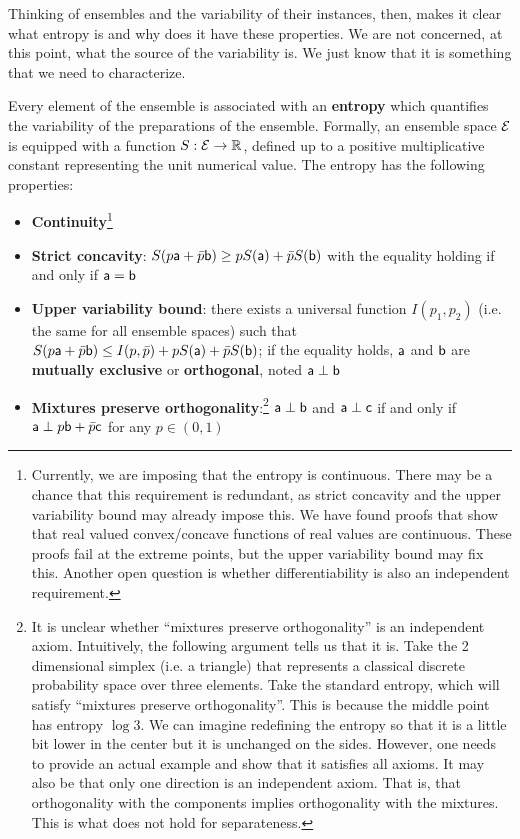 Thinking of ensembles and the variability of their instances, then, makes it clear what entropy is and why does it have these properties. We are not concerned, at this point, what the source of the variability is. We just know that it is something that we need to characterize.

\begin{mathSection}
\begin{axiom}
	Every element of the ensemble is associated with an \textbf{entropy} which quantifies the variability of the preparations of the ensemble. Formally, an ensemble space $\Ens$ is equipped with a function $S : \Ens \to \mathbb{R}$, defined up to a positive multiplicative constant representing the unit numerical value. The entropy has the following properties:
	\begin{itemize}
		\item \textbf{Continuity}\footnote{Currently, we are imposing that the entropy is continuous. There may be a chance that this requirement is redundant, as strict concavity and the upper variability bound may already impose this. We have found proofs that show that real valued convex/concave functions of real values are continuous. These proofs fail at the extreme points, but the upper variability bound may fix this. Another open question is whether differentiability is also an independent requirement.}
		\item \textbf{Strict concavity}: $S(p\ens[a] + \bar{p} \ens[b]) \geq p S(\ens[a]) + \bar{p} S(\ens[b])$ with the equality holding if and only if $\ens[a] = \ens[b]$
		\item \textbf{Upper variability bound}: there exists a universal function $I(p_1, p_2)$ (i.e. the same for all ensemble spaces) such that $S(p\ens[a] + \bar{p} \ens[b]) \leq I(p, \bar{p}) + p S(\ens[a]) + \bar{p} S(\ens[b])$; if the equality holds, $\ens[a]$ and $\ens[b]$ are \textbf{mutually exclusive} or \textbf{orthogonal}, noted $\ens[a] \ortho \ens[b]$
		\item \textbf{Mixtures preserve orthogonality}:\footnote{It is unclear whether ``mixtures preserve orthogonality'' is an independent axiom. Intuitively, the following argument tells us that it is. Take the 2 dimensional simplex (i.e. a triangle) that represents a classical discrete probability space over three elements. Take the standard entropy, which will satisfy ``mixtures preserve orthogonality''. This is because the middle point has entropy $\log 3$. We can imagine redefining the entropy so that it is a little bit lower in the center but it is unchanged on the sides. However, one needs to provide an actual example and show that it satisfies all axioms. It may also be that only one direction is an independent axiom. That is, that orthogonality with the components implies orthogonality with the mixtures. This is what does not hold for separateness.} $\ens[a] \ortho \ens[b]$ and $\ens[a] \ortho \ens[c]$ if and only if $\ens[a] \ortho p \ens[b] + \bar{p} \ens[c]$ for any $p \in (0,1)$
	\end{itemize}
\end{axiom}


\end{mathSection}
